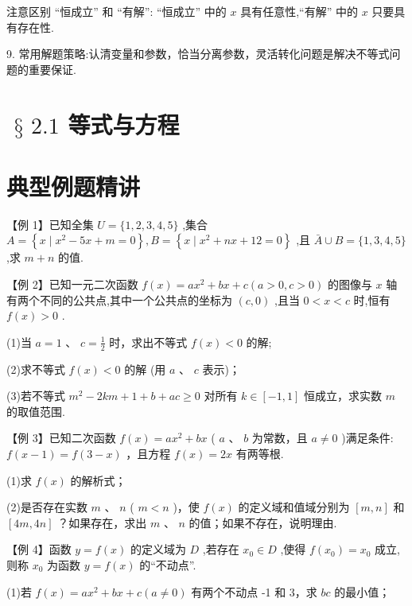 注意区别 “恒成立” 和 “有解”: “恒成立” 中的 $x$ 具有任意性,“有解” 中的 $x$ 只要具有存在性.

9. 常用解题策略:认清变量和参数，恰当分离参数，灵活转化问题是解决不等式问题的重要保证.

\section*{$\text{ § }{2.1}$ 等式与方程}

\section*{典型例题精讲}

【例 1】已知全集 $U = \{ 1,2,3,4,5\}$ ,集合 $A = \left\{  {x \mid  {x}^{2} - {5x} + m = 0}\right\}  ,B = \left\{  {x \mid  {x}^{2} + {nx} + {12} = 0}\right\}$ ,且 $\bar{A} \cup  B  = \{ 1,3,4,5\}$ ,求 $m + n$ 的值.

【例 2】已知一元二次函数 $f\left( x\right)  = a{x}^{2} + {bx} + c\left( {a > 0,c > 0}\right)$ 的图像与 $x$ 轴有两个不同的公共点,其中一个公共点的坐标为 $\left( {c,0}\right)$ ,且当 $0 < x < c$ 时,恒有 $f\left( x\right)  > 0$ .

(1)当 $a = 1\text{ 、 }c = \frac{1}{2}$ 时，求出不等式 $f\left( x\right)  < 0$ 的解;

(2)求不等式 $f\left( x\right)  < 0$ 的解 (用 $a$ 、 $c$ 表示)；

(3)若不等式 ${m}^{2} - {2km} + 1 + b + {ac} \geq  0$ 对所有 $k \in  \left\lbrack  {-1,1}\right\rbrack$ 恒成立，求实数 $m$ 的取值范围.

【例 3】已知二次函数 $f\left( x\right)  = a{x}^{2} + {bx}$ ( $a$ 、 $b$ 为常数，且 $a \neq  0$ )满足条件: $f\left( {x - 1}\right)  = f\left( {3 - x}\right)$ ，且方程 $f\left( x\right)  = {2x}$ 有两等根.

(1)求 $f\left( x\right)$ 的解析式；

(2)是否存在实数 $m$ 、 $n$ ( $m < n$ )，使 $f\left( x\right)$ 的定义域和值域分别为 $\left\lbrack  {m,n}\right\rbrack$ 和 $\left\lbrack  {{4m},{4n}}\right\rbrack$ ？如果存在，求出 $m\text{ 、 }n$ 的值；如果不存在，说明理由.

【例 4】函数 $y = f\left( x\right)$ 的定义域为 $D$ ,若存在 ${x}_{0} \in  D$ ,使得 $f\left( {x}_{0}\right)  = {x}_{0}$ 成立,则称 ${x}_{0}$ 为函数 $y = f\left( x\right)$ 的“不动点”.

(1)若 $f\left( x\right)  = a{x}^{2} + {bx} + c\left( {a \neq  0}\right)$ 有两个不动点 -1 和 3，求 ${bc}$ 的最小值；

